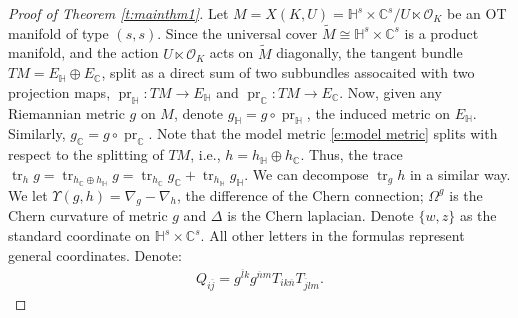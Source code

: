 \documentclass[12pt]{amsart}
\numberwithin{equation}{section}
\numberwithin{prop}{section}
\theoremstyle{definition}
\newcommand{\til}[1]{\widetilde{#1}}
\renewcommand{\bar}[1]{\overline{#1}}
\begin{document}
\begin{proof}[Proof of Theorem \ref{t:mainthm1}]
Let $M=X(K,U) = \mathbb{H}^s\times\mathbb{C}^s/U\ltimes \mathcal{O}_K$ be an OT manifold of type $(s,s)$. Since the universal cover $\til{M}\cong\mathbb{H}^s\times\mathbb{C}^s$ is a product manifold, and the action $U\ltimes \mathcal{O}_K$ acts on $\til{M}$ diagonally, the tangent bundle $TM = E_{\mathbb{H}}\oplus E_{\mathbb{C}}$, split as a direct sum of two subbundles assocaited with two projection maps, $\operatorname{pr}_{\mathbb{H}}:TM\to E_\mathbb{H}$ and $\operatorname{pr}_{\mathbb{C}}:TM\to E_\mathbb{C}$.  Now, given any Riemannian metric $g$ on $M$, denote $g_\mathbb{H} = g\circ \operatorname{pr}_\mathbb{H}$, the induced metric on $E_\mathbb{H}$. Similarly, $g_\mathbb{C} = g\circ \operatorname{pr}_\mathbb{C}$. Note that the model metric \ref{e:model metric} splits with respect to the splitting of $TM$, i.e., $h = h_\mathbb{H}\oplus h_\mathbb{C}$. Thus, the trace $\operatorname{tr}_h g = \operatorname{tr}_{h_\mathbb{C}\oplus h_\mathbb{H}} g= \operatorname{tr}_{h_\mathbb{C}} g_\mathbb{C} + \operatorname{tr}_{h_\mathbb{H}}g_\mathbb{H}$. We can decompose $\operatorname{tr}_g h$ in a similar way.  We let $\Upsilon(g, h)=\nabla_g-\nabla_h$, the difference of the Chern connection; $\Omega^g$ is the Chern curvature of metric $g$ and $\Delta$ is the Chern laplacian. Denote $\{w,z\}$ as the standard coordinate on $\mathbb{H}^s\times \mathbb{C}^s$. All other letters in the formulas represent general coordinates. Denote:
\begin{align*}
    Q_{i \bar{j}}=g^{\bar{l} k} g^{\bar{n} m} T_{i k \bar{n}} T_{\bar{j} l m}.
\end{align*}


\end{proof}
\end{document}

